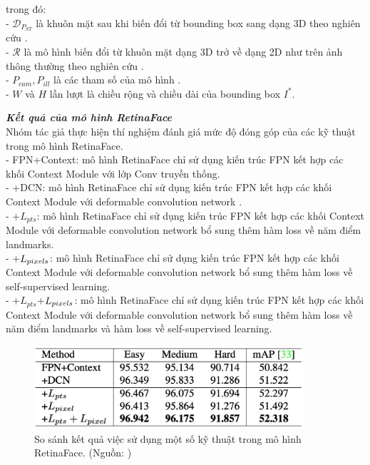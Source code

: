 {    \noindent
    trong đó: \\
    - $\mathcal{D}_{P_{ST}}$ là khuôn mặt sau khi biến đổi từ bounding box  sang dạng 3D theo nghiên cứu \cite{zhou2019dense}. \\
    - $\mathcal{R}$ là mô hình biến đổi từ khuôn mặt dạng 3D trở về dạng 2D như trên ảnh thông thường theo nghiên cứu \cite{genova2018unsupervised}. \\
    - $P_{cam}, P_{ill}$ là các tham số của mô hình \cite{genova2018unsupervised}. \\
    - $W$ và $H$ lần lượt là chiều rộng và chiều dài của bounding box  $I^*$.

    \noindent
    \textbf{\textit{Kết quả của mô hình RetinaFace}} \\
    Nhóm tác giả thực hiện thí nghiệm đánh giá mức độ đóng góp của các kỹ thuật trong mô hình RetinaFace. \\
    - FPN+Context: mô hình RetinaFace chỉ sử dụng kiến trúc FPN kết hợp các khối Context Module \cite{najibi2017ssh} với lớp Conv  truyền thống. \\
    - +DCN: mô hình RetinaFace chỉ sử dụng kiến trúc FPN kết hợp các khối Context Module \cite{najibi2017ssh} với deformable convolution network \cite{dai2017deformable}. \\
    - +$L_{pts}$: mô hình RetinaFace chỉ sử dụng kiến trúc FPN kết hợp các khối Context Module \cite{najibi2017ssh} với deformable convolution network \cite{dai2017deformable} bổ sung thêm hàm loss về năm điểm landmarks. \\
    - +$L_{pixels \index{pixels}}$: mô hình RetinaFace chỉ sử dụng kiến trúc FPN kết hợp các khối Context Module \cite{najibi2017ssh} với deformable convolution network \cite{dai2017deformable} bổ sung thêm hàm loss về self-supervised learning. \\
    - +$L_{pts}$+$L_{pixels \index{pixels}}$: mô hình RetinaFace chỉ sử dụng kiến trúc FPN kết hợp các khối Context Module \cite{najibi2017ssh} với deformable convolution network \cite{dai2017deformable} bổ sung thêm hàm loss về năm điểm landmarks và hàm loss về self-supervised learning. \\

    \begin{figure}[H]
        \centering
        \includegraphics[width=10cm] {images/retinaface_results_1}
        \caption{So sánh kết quả việc sử dụng một số kỹ thuật trong mô hình RetinaFace. (Nguồn: \cite{deng2020retinaface})}
        \label{fig:retinaface_results_1}
    \end{figure}

}
